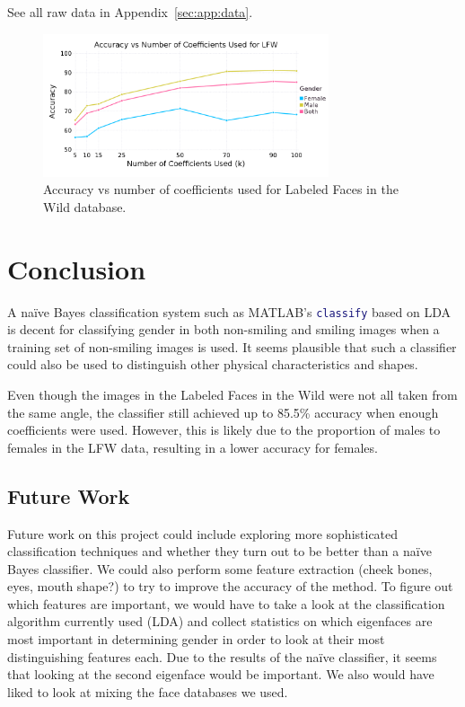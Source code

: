 \documentclass[hidelinks,11pt]{article}
\begin{document}
See all raw data in Appendix~\ref{sec:app:data}.

\begin{figure}[!ht]
  \centering
  \includegraphics[width=0.75\textwidth]{accuracy_k_lfw.png}
  \caption{Accuracy vs number of coefficients used for Labeled Faces in the
  Wild database.}
  \label{fig:analysis:lda:accuracy_lfw}
\end{figure}

\section{Conclusion}
\label{sec:conclusion}

A na\"ive Bayes classification system such as MATLAB's
\lstinline[language=Matlab]!classify! based on LDA is decent for classifying
gender in both non-smiling and smiling images when a training set of non-smiling
images is used. It seems plausible that such a classifier could also be used to
distinguish other physical characteristics and shapes. 

Even though the images in the Labeled Faces in the Wild were not all taken from
the same angle, the classifier still achieved up to 85.5\% accuracy when enough
coefficients were used. However, this is likely due to the proportion of males
to females in the LFW data, resulting in a lower accuracy for females.

\subsection{Future Work}
\label{sec:conclusion:future}

Future work on this project could include exploring more sophisticated
classification techniques and whether they turn out to be better than a na\"ive
Bayes classifier. We could also perform some feature extraction (cheek bones,
eyes, mouth shape?) to try to improve the accuracy of the method. To figure out
which features are important, we would have to take a look at the classification
algorithm currently used (LDA) and collect statistics on which eigenfaces are
most important in determining gender in order to look at their most
distinguishing features each. Due to the results of the na\"ive classifier, it
seems that looking at the second eigenface would be important. 
We also would have liked to look at mixing the face databases we used.
\end{document}
